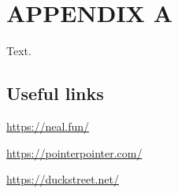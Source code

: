 \section{APPENDIX A}

Text.

\subsection{Useful links}

\url{https://neal.fun/}

\url{https://pointerpointer.com/}

\url{https://duckstreet.net/}